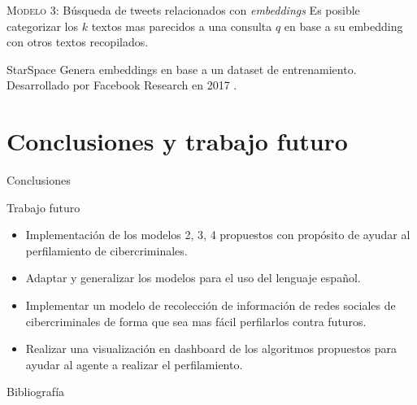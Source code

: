 \documentclass[10pt]{beamer}
\begin{document}
\begin{frame}{\textsc{Modelo 3:} Búsqueda de tweets relacionados con \emph{embeddings}}
  Es posible categorizar los $k$ textos mas parecidos a una consulta $q$ en base a su embedding con otros textos recopilados.

  \begin{alertblock}{StarSpace}
    Genera embeddings en base a un dataset de entrenamiento. Desarrollado por Facebook Research en 2017 \cite{starspace}. 
  \end{alertblock}
\end{frame}

\section{Conclusiones y trabajo futuro}

\begin{frame}{Conclusiones}
\end{frame}

\begin{frame}{Trabajo futuro}
  \begin{itemize}
  \item Implementación de los modelos 2, 3, 4 propuestos con propósito de ayudar al perfilamiento de cibercriminales.
    \item Adaptar y generalizar los modelos para el uso del lenguaje español.
  \item Implementar un modelo de recolección de información de redes sociales de cibercriminales de forma que sea mas fácil perfilarlos contra futuros.
  \item Realizar una visualización en dashboard de los algoritmos propuestos para ayudar al agente a realizar el perfilamiento.
  \end{itemize}
\end{frame}

\appendix
{}
\begin{frame}[allowframebreaks]{Bibliografía}

  
  

\end{frame}
\end{document}
